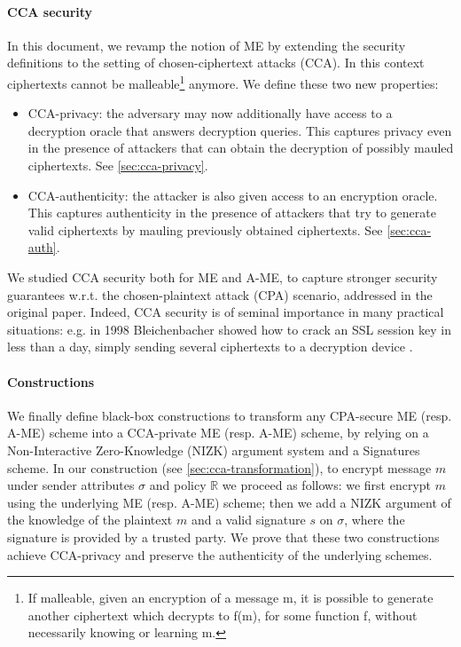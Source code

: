 \paragraph{CCA security}
In this document, we revamp the notion of ME by extending the security definitions to the setting of chosen-ciphertext attacks (CCA).
In this context ciphertexts cannot be malleable\footnote{If malleable, given an encryption of a message m, it is possible to generate another ciphertext which decrypts to f(m), for some function f, without necessarily knowing or learning m.} anymore.
\newline\newline
We define these two new properties:
\begin{itemize}
    \item CCA-privacy: the adversary may now additionally have access to a decryption oracle that answers decryption queries. This captures privacy even in the presence of attackers that can obtain the decryption of possibly mauled ciphertexts. See \ref{sec:cca-privacy}.
    \item CCA-authenticity: the attacker is also given access to an encryption oracle. This captures authenticity in the presence of attackers that try to generate valid ciphertexts by mauling previously obtained ciphertexts. See \ref{sec:cca-auth}.
\end{itemize}
We studied CCA security both for ME and A-ME, to capture stronger security guarantees w.r.t. the chosen-plaintext attack (CPA) scenario, addressed in the original paper.
Indeed, CCA security is of seminal importance in many practical situations: e.g. in 1998 Bleichenbacher showed how to crack an SSL session key in less than a day, simply sending several ciphertexts to a decryption device \cite{Bleichenbacher}.

\paragraph{Constructions}
We finally define black-box constructions to transform any CPA-secure ME (resp. A-ME) scheme into a CCA-private ME (resp. A-ME) scheme, by relying on a Non-Interactive Zero-Knowledge (NIZK) argument system and a Signatures scheme.
\newline\newline
In our construction (see \ref{sec:cca-transformation}), to encrypt message $m$ under sender attributes $\sigma$ and policy $\mathbb{R}$ we proceed as follows: we first encrypt $m$ using the underlying ME (resp. A-ME) scheme; then we add a NIZK argument of the knowledge of the plaintext $m$ and a valid signature $s$ on $\sigma$, where the signature is provided by a trusted party.
\newline
We prove that these two constructions achieve CCA-privacy and preserve the authenticity of the underlying schemes.
